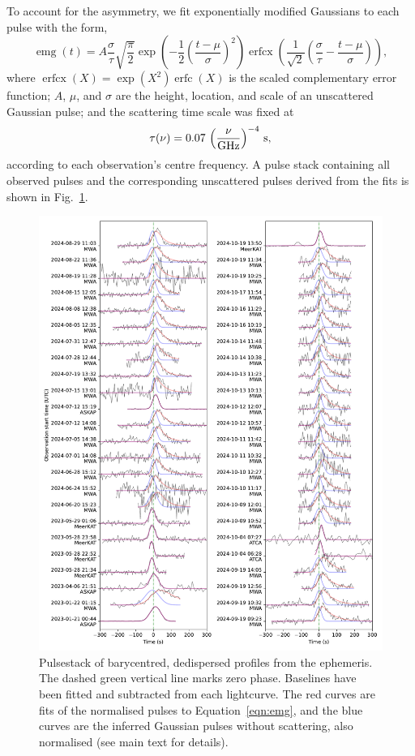 \documentclass[fleqn,usenatbib]{mnras}
\DeclareMathOperator{\erfcx}{erfcx}
\DeclareMathOperator{\erfc}{erfc}
\DeclareMathOperator{\emg}{emg}
\newcommand{\Fig}{Fig.}
\newcommand{\Eqn}{Equation}
\begin{document}
To account for the asymmetry, we fit exponentially modified Gaussians to each pulse with the form,
\begin{equation}
  \emg(t) = A \frac{\sigma}{\tau}\sqrt{\frac{\pi}{2}}
    \exp\left(-\frac12 \left( \frac{t - \mu}{\sigma} \right)^2 \right)  \erfcx \left(\frac{1}{\sqrt{2}} \left(\frac{\sigma}{\tau} - \frac{t - \mu}{\sigma} \right) \right),
  \label{eqn:emg}
\end{equation}
where $\erfcx(X) = \exp(X^2) \erfc(X)$ is the scaled complementary error function; $A$, $\mu$, and $\sigma$ are the height, location, and scale of an unscattered Gaussian pulse; and the scattering time scale was fixed at
\begin{equation}
      \tau(\nu) = 0.07\, \left(\frac{\nu}{\rm GHz}\right)^{-4} \, {\rm s},
\end{equation}
according to each observation's centre frequency.
A pulse stack containing all observed pulses and the corresponding unscattered pulses derived from the fits is shown in \Fig~\ref{fig:pulsestack}.

\begin{figure}
      \centering
          \includegraphics[width=0.95\linewidth]{pulsestack.pdf}
              \caption{Pulsestack of barycentred, dedispersed profiles from the ephemeris. The dashed green vertical line marks zero phase. Baselines have been fitted and subtracted from each lightcurve. The red curves are fits of the normalised pulses to \Eqn~\ref{eqn:emg}, and the blue curves are the inferred Gaussian pulses without scattering, also normalised (see main text for details).}
                  \label{fig:pulsestack}
\end{figure}
\end{document}
